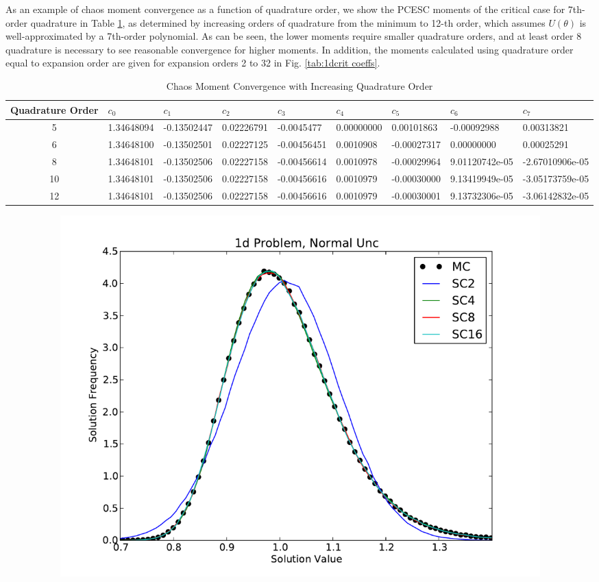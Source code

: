 As an example of chaos moment convergence as a function of quadrature order, we show the PCESC moments of the critical case for 7th-order quadrature in Table \ref{tab:quadconverge}, as determined by increasing orders of quadrature from the minimum to 12-th order, which assumes $U(\theta)$ is well-approximated by a 7th-order polynomial.  As can be seen, the lower moments require smaller quadrature orders, and at least order 8 quadrature is necessary to see reasonable convergence for higher moments.  In addition, the moments calculated using quadrature order equal to expansion order are given for expansion orders 2 to 32 in Fig. \ref{tab:1dcrit coeffs}.
\begin{landscape}
\begin{table}[H]
\begin{center}
\begin{tabular}{c | *{8}{l}}
Quadrature Order & $c_0$ & $c_1$ & $c_2$ & $c_3$ & $c_4$ & $c_5$ & $c_6$ & $c_7$ \\ \hline
5 & 1.34648094 & -0.13502447 & 0.02226791 & -0.0045477 & 0.00000000 & 0.00101863 & -0.00092988 & 0.00313821\\
6 & 1.34648100 & -0.13502501 & 0.02227125 & -0.00456451 & 0.0010908 & -0.00027317 &  0.00000000 & 0.00025291\\ 
8 & 1.34648101 & -0.13502506 & 0.02227158 & -0.00456614 & 0.0010978 & -0.00029964 & 9.01120742e-05 & -2.67010906e-05\\ 
10& 1.34648101 & -0.13502506 & 0.02227158 & -0.00456616 & 0.0010979 & -0.00030000 & 9.13419949e-05 & -3.05173759e-05\\ 
12& 1.34648101 & -0.13502506 & 0.02227158 & -0.00456616 & 0.0010979 & -0.00030001 & 9.13732306e-05 & -3.06142832e-05
\end{tabular}
\end{center}
\caption{Chaos Moment Convergence with Increasing Quadrature Order}
\label{tab:quadconverge}
\end{table}
\vspace{50pt}
\begin{figure}[H]
\centering
\begin{subfigure}[b]{0.43\textwidth}
   \includegraphics[width=\textwidth]{../graphics/1d_normal_pdfs}

\end{subfigure}
\end{figure}
\end{landscape}
